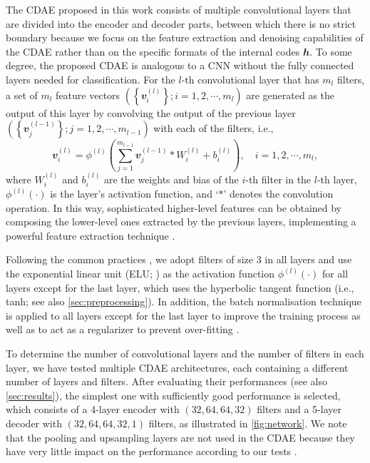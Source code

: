 \documentclass[fleqn,usenatbib]{mnras}
\newcommand{\B}[1]{\mathbfit{#1}}
\newcommand{\editone}[1]{{\leavevmode\color{cyan}#1}}
\begin{document}
\editone{%
The CDAE proposed in this work consists of multiple convolutional layers
that are divided into the encoder and decoder parts, between which there is
no strict boundary because we focus on the feature extraction and denoising
capabilities of the CDAE rather than on the specific formats of the
internal codes $\B{h}$.
To some degree, the proposed CDAE is analogous to a CNN without the fully
connected layers needed for classification.
For the $l$-th convolutional layer that has $m_l$ filters, a set of $m_l$
feature vectors
$\left(\left\{ \B{v}_{i}^{(l)} \right\}; i = 1, 2, \cdots, m_l \right)$
are generated as the output of this layer by convolving the output of the
previous layer
$\left(\left\{ \B{v}_{j}^{(l-1)} \right\}; j = 1, 2, \cdots, m_{l-1} \right)$
with each of the filters, i.e.,
\begin{equation}
  \label{eq:conv}
  \B{v}_{i}^{(l)} = \phi^{(l)} \left( \sum_{j=1}^{m_{l-1}}
    \B{v}_{j}^{(l-1)} * W_i^{(l)} + b_i^{(l)} \right),
    \quad i = 1, 2, \cdots, m_{l},
\end{equation}
where
$W_i^{(l)}$ and $b_i^{(l)}$ are the weights and bias of the $i$-th filter
in the $l$-th layer, $\phi^{(l)}(\cdot)$ is the layer's activation
function, and `$*$' denotes the convolution operation.
In this way, sophisticated higher-level features can be obtained by
composing the lower-level ones extracted by the previous layers,
implementing a powerful feature extraction technique \citep{lecun2015}.

Following the common practices \citep[e.g.,][]{geron2017,suganuma2018},
we adopt filters of size 3 in all layers and use the exponential linear
unit (ELU; \citealt{clevert2016}) as the activation function
$\phi^{(l)}(\cdot)$ for all layers except for the last layer, which uses
the hyperbolic tangent function (i.e., tanh;
see also \autoref{sec:preprocessing}).
In addition, the batch normalisation technique is applied to all layers
except for the last layer to improve the training process as well as to act
as a regularizer to prevent over-fitting \citep{ioffe2015}.

To determine the number of convolutional layers and the number of filters
in each layer, we have tested multiple CDAE architectures, each containing
a different number of layers and filters.
After evaluating their performances (see also \autoref{sec:results}),
the simplest one with sufficiently good performance is selected,
which consists of a 4-layer encoder with $(32,64,64,32)$ filters and
a 5-layer decoder with $(32,64,64,32,1)$ filters, as illustrated in
\autoref{fig:network}.
We note that the pooling and upsampling layers are not used in the CDAE
because they have very little impact on the performance according to our
tests \citep[see also][]{springenberg2015}.
} %
\end{document}
